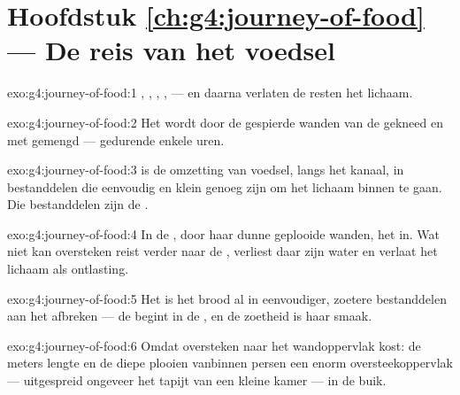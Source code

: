 \section*{Hoofdstuk \ref{ch:g4:journey-of-food} --- De reis van het voedsel}

\begin{solution}{exo:g4:journey-of-food:1}
, , , ,  --- en daarna verlaten de
resten het lichaam.
\end{solution}

\begin{solution}{exo:g4:journey-of-food:2}
Het wordt door de gespierde wanden van de  gekneed en met
 gemengd --- gedurende enkele uren.
\end{solution}

\begin{solution}{exo:g4:journey-of-food:3}
 is de omzetting van voedsel, langs het kanaal, in
bestanddelen die eenvoudig en klein genoeg zijn om het lichaam binnen
te gaan. Die bestanddelen zijn de .
\end{solution}

\begin{solution}{exo:g4:journey-of-food:4}
In de , door haar dunne geplooide wanden, het  in. Wat
niet kan oversteken reist verder naar de , verliest daar zijn
water en verlaat het lichaam als ontlasting.
\end{solution}

\begin{solution}{exo:g4:journey-of-food:5}
Het  is het brood al in eenvoudiger, zoetere bestanddelen aan
het afbreken --- de  begint in de , en de zoetheid is haar
smaak.
\end{solution}

\begin{solution}{exo:g4:journey-of-food:6}
Omdat oversteken naar het  wandoppervlak kost: de meters lengte en
de diepe plooien vanbinnen persen een enorm oversteekoppervlak ---
uitgespreid ongeveer het tapijt van een kleine kamer --- in de buik.
\end{solution}

